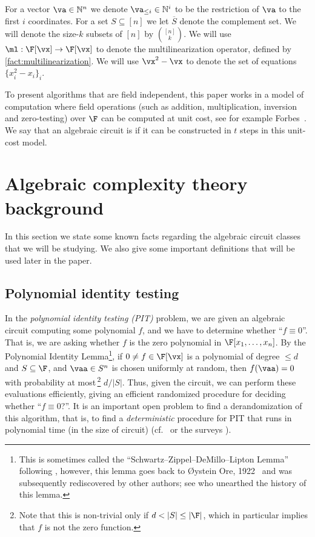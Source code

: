 \documentclass[11pt]{article}
\numberwithin{equation}{section}
\theoremstyle{definition}
\theoremstyle{plain}
\newcommand{\N}{\mathbb N}
\begin{document}
For a vector $\va\in\N^n$ we denote $\va_{\le i}\in\N^i$ to be the restriction of $\va$ to the first $i$ coordinates. For a set $S \subseteq [n]$ we let $\overline{S}$ denote the complement set.  We will denote the size-$k$ subsets of $[n]$ by $\binom{[n]}{k}$.  We will use $\ml:\F[\vx]\to\F[\vx]$ to denote the multilinearization operator, defined by \autoref{fact:multilinearization}.  We will use $\vx^2-\vx$ to denote the set of equations $\{x_i^2 -x_i\}_i$.

To present algorithms that are field independent, this paper works in a model of computation where field operations (such as addition, multiplication, inversion and zero-testing) over $\F$ can be computed at unit cost, see for example Forbes~\cite[Appendix A]{Forbes14}. We say that an algebraic circuit is  if it can be constructed in $t$ steps in this unit-cost model.

%
%
%
%

\section{Algebraic complexity theory background}\label{sec:background}

In this section we state some known facts regarding the algebraic circuit classes that we will be studying. We also give some important definitions that will be used later in the paper.

\subsection{Polynomial identity testing}\label{sec:PIT}

In the \emph{polynomial identity testing (PIT)} problem, we are given an algebraic circuit computing some polynomial $f$, and we have to determine whether ``$f\equiv 0$''.  That is, we are asking whether $f$ is the zero polynomial in $\F[x_1,\ldots,x_n]$. By the Polynomial Identity Lemma\footnote{This is sometimes called the ``Schwartz--Zippel--DeMillo--Lipton Lemma'' following \cite{Zippel79,Schwartz80,DeMilloLipton78}, however, this lemma goes back to {\O}ystein Ore, 1922~\cite{ore}
and was subsequently rediscovered
by other authors; see \cite{arvind} who unearthed the history of this lemma.}, if $0\ne f \in \F[\vx]$ is a polynomial of degree $\le d$ and $S\subseteq \F$, and $\vaa\in S^n$ is chosen uniformly at random, then $f(\vaa) =0$ with probability at most\,\footnote{Note that this is non-trivial only if $d < |S| \leq |\F|$, which in particular implies that $f$ is not the zero function.} $d/|S|$. Thus, given the circuit, we can perform these evaluations efficiently, giving an efficient randomized procedure for deciding whether ``$f\equiv 0$?''.  It is an important open problem to find a derandomization of this algorithm, that is, to find a \emph{deterministic} procedure for PIT that runs in polynomial time (in the size of circuit) (cf.~\cite[Chap.~4]{SY10} or the surveys \cite{DBLP:journals/eatcs/Saxena09,Saxena2014}).
\end{document}
